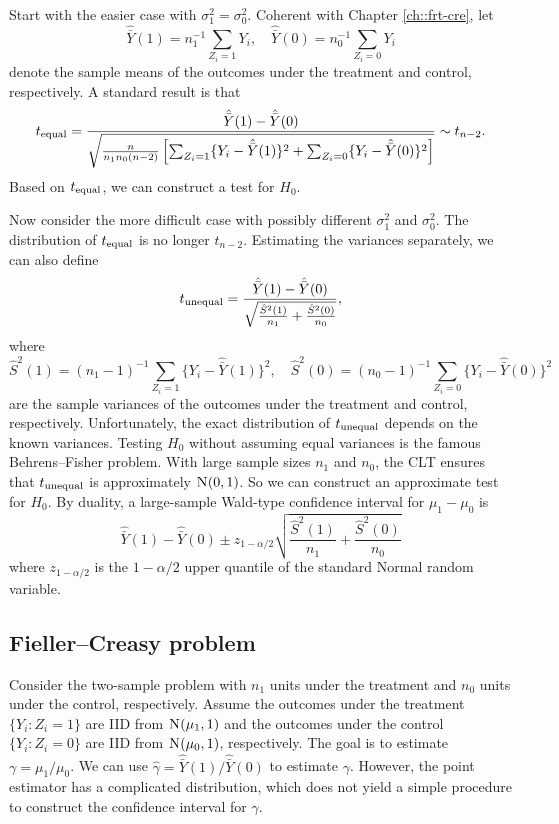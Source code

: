 Start with the easier case with $\sigma_1^2  = \sigma_0^2.$ Coherent with Chapter \ref{ch::frt-cre}, let 
$$
\hat{\bar{Y}}(1) = n_1^{-1} \sum_{Z_i =1}  Y_i ,\quad
\hat{\bar{Y}}(0) = n_0^{-1} \sum_{Z_i =0}  Y_i
$$
denote the sample means of the outcomes under the treatment and control, respectively. 
A standard result is that 
$$
t_\textup{equal} = 
\frac{  \hat{\bar{Y}}(1) - \hat{\bar{Y}}(0)    }{  \sqrt{\frac{n}{n_1 n_0(n-2)}  \left[  \sum_{Z_i=1}  \{Y_i - \hat{\bar{Y}}(1)\}^2
+ \sum_{Z_i=0}  \{Y_i - \hat{\bar{Y}}(0)\}^2
    \right]  }    }   \sim t_{n-2}.
$$     
Based on $t_\textup{equal} $, we can construct a test for $H_0.$


Now consider the more difficult case with possibly different $\sigma_1^2  $ and $ \sigma_0^2.$ The distribution of $t_\textup{equal}$ is no longer $t_{n-2}.$ Estimating the variances separately, we can also define
$$
t_\textup{unequal} = \frac{    \hat{\bar{Y}}(1)  -   \hat{\bar{Y}}(0)    }{  \sqrt{  \frac{  \hat{S}^2(1)  }{n_1}  + \frac{\hat{S}^2(0)}{n_0}  }   },
$$
where 
$$
\hat{S}^2(1) = (n_1 - 1)^{-1} \sum_{Z_i =1} \{ Y_i  -\hat{\bar{Y}}(1)   \}^2,\quad
\hat{S}^2(0) = (n_0 - 1)^{-1} \sum_{Z_i =0} \{ Y_i  -\hat{\bar{Y}}(0)   \}^2 
$$
are the sample variances of the outcomes under the treatment and control, respectively.  Unfortunately, the exact distribution of $t_\textup{unequal} $ depends on the known variances. Testing $H_0$ without assuming equal variances is the famous Behrens--Fisher problem.  With large sample sizes $n_1$ and $n_0$, the CLT ensures that $t_\textup{unequal} $ is approximately $\N01$. So we can construct an approximate test for $H_0.$ By duality, a large-sample Wald-type confidence interval for $\mu_1 - \mu_0$ is
$$
 \hat{\bar{Y}}(1)  -   \hat{\bar{Y}}(0)   \pm z_{1-\alpha/2}    \sqrt{  \frac{  \hat{S}^2(1)  }{n_1}  + \frac{\hat{S}^2(0)}{n_0}  }     
$$
where $z_{1-\alpha/2}$ is the $1-\alpha/2$ upper quantile of the standard Normal random variable.


 



\subsection{Fieller--Creasy problem}\label{sec::fc-problem}

Consider the two-sample problem with $n_1$ units under the treatment and $n_0$ units under the control, respectively. Assume the outcomes under the treatment $\{  Y_i: Z_i = 1 \}$ are IID from $\textsc{N} (\mu_1, 1)$ and the outcomes under the control $\{  Y_i: Z_i = 0 \}$ are IID from $\textsc{N} (\mu_0, 1)$, respectively. The goal is to estimate $\gamma = \mu_1 / \mu_0$. We can use $\hat\gamma = \hat{\bar{Y}}(1)  / \hat{\bar{Y}}(0) $ to estimate $\gamma$. However, the point estimator has a complicated distribution, which does not yield a simple procedure to construct the confidence interval for $\gamma$. 



